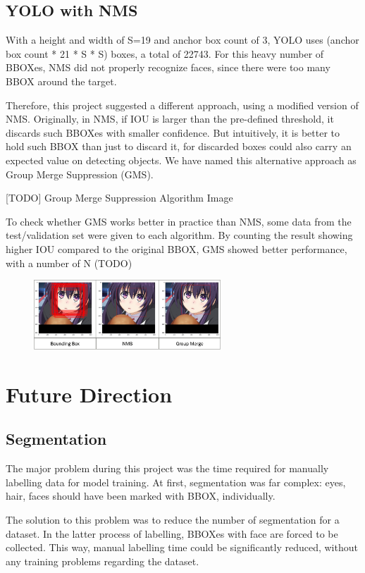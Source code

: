 \documentclass{article}
\begin{document}
\subsection{YOLO with NMS}
With a height and width of S=19 and anchor box count of 3, YOLO uses (anchor box
count * 21 * S * S) boxes, a total of 22743. For this heavy number of BBOXes,
NMS did not properly recognize faces, since there were too many BBOX around the
target.

Therefore, this project suggested a different approach, using a modified version
of NMS. Originally, in NMS, if IOU is larger than the pre-defined threshold, it
discards such BBOXes with smaller confidence. But intuitively, it is better to
hold such BBOX than just to discard it, for discarded boxes could also carry an
expected value on detecting objects. We have named this alternative approach as
Group Merge Suppression (GMS).

[TODO] Group Merge Suppression Algorithm Image

To check whether GMS works better in practice than NMS, some data from the
test/validation set were given to each algorithm. By counting the result showing
higher IOU compared to the original BBOX, GMS showed better performance, with a
number of N (TODO)

\begin{figure}[h]
  \centering
  \includegraphics[width=7cm]{image/GMSvsNMS.png}
\end{figure}

\section{Future Direction}
\subsection{Segmentation}
The major problem during this project was the time required for manually
labelling data for model training. At first, segmentation was far complex: eyes,
hair, faces should have been marked with BBOX, individually.

The solution to this problem was to reduce the number of segmentation for a
dataset. In the latter process of labelling, BBOXes with face are forced to be
collected. This way, manual labelling time could be significantly reduced,
without any training problems regarding the dataset.
\end{document}

